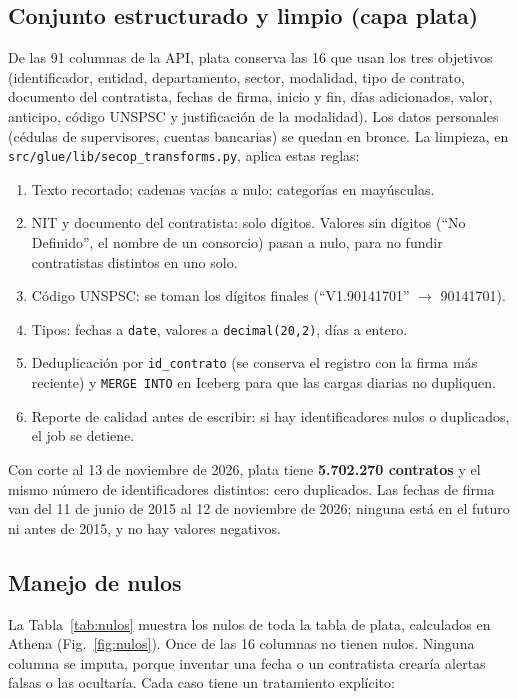 \documentclass[conference,a4paper]{IEEEtran}
\newcommand{\code}[1]{\texttt{#1}}
\begin{document}
\subsection{Conjunto estructurado y limpio (capa plata)}
\label{sec:limpieza}
De las 91 columnas de la API, plata conserva las 16 que usan los tres objetivos (identificador, entidad,
departamento, sector, modalidad, tipo de contrato, documento del contratista, fechas de firma, inicio y fin,
días adicionados, valor, anticipo, código UNSPSC y justificación de la modalidad). Los datos personales
(cédulas de supervisores, cuentas bancarias) se quedan en bronce. La limpieza, en
\code{src/glue/lib/secop\_transforms.py}, aplica estas reglas:
\begin{enumerate}
  \item Texto recortado; cadenas vacías a nulo; categorías en mayúsculas.
  \item NIT y documento del contratista: solo dígitos. Valores sin dígitos (``No Definido'', el nombre de un
        consorcio) pasan a nulo, para no fundir contratistas distintos en uno solo.
  \item Código UNSPSC: se toman los dígitos finales (``V1.90141701'' $\rightarrow$ 90141701).
  \item Tipos: fechas a \code{date}, valores a \code{decimal(20,2)}, días a entero.
  \item Deduplicación por \code{id\_contrato} (se conserva el registro con la firma más reciente) y
        \code{MERGE INTO} en Iceberg para que las cargas diarias no dupliquen.
  \item Reporte de calidad antes de escribir: si hay identificadores nulos o duplicados, el job se detiene.
\end{enumerate}

Con corte al 13 de noviembre de 2026, plata tiene \textbf{5.702.270 contratos} y el mismo número de
identificadores distintos: cero duplicados. Las fechas de firma van del 11 de junio de 2015 al 12 de noviembre de
2026; ninguna está en el futuro ni antes de 2015, y no hay valores negativos.

\subsection{Manejo de nulos}
La Tabla~\ref{tab:nulos} muestra los nulos de toda la tabla de plata, calculados en Athena (Fig.~\ref{fig:nulos}).
Once de las 16 columnas no tienen nulos. Ninguna columna se imputa, porque inventar una fecha o un contratista
crearía alertas falsas o las ocultaría. Cada caso tiene un tratamiento explícito:
\end{document}
